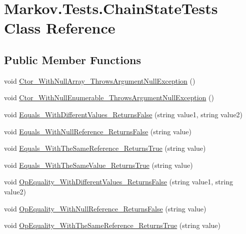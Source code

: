 \hypertarget{class_markov_1_1_tests_1_1_chain_state_tests}{}\section{Markov.\+Tests.\+Chain\+State\+Tests Class Reference}
\label{class_markov_1_1_tests_1_1_chain_state_tests}
\subsection*{Public Member Functions}
\begin{DoxyCompactItemize}
\item 
void \mbox{\hyperlink{class_markov_1_1_tests_1_1_chain_state_tests_a1732c1d9f5264c4b3a4f7db62c382887}{Ctor\+\_\+\+With\+Null\+Array\+\_\+\+Throws\+Argument\+Null\+Exception}} ()
\item 
void \mbox{\hyperlink{class_markov_1_1_tests_1_1_chain_state_tests_a8df3344f8b729836e3906feee2ed6e0c}{Ctor\+\_\+\+With\+Null\+Enumerable\+\_\+\+Throws\+Argument\+Null\+Exception}} ()
\item 
void \mbox{\hyperlink{class_markov_1_1_tests_1_1_chain_state_tests_a6266a5a184b0027b239970f1bd4d3cd9}{Equals\+\_\+\+With\+Different\+Values\+\_\+\+Returns\+False}} (string value1, string value2)
\item 
void \mbox{\hyperlink{class_markov_1_1_tests_1_1_chain_state_tests_a2af281c58c6143a94872ab96e3c89628}{Equals\+\_\+\+With\+Null\+Reference\+\_\+\+Returns\+False}} (string value)
\item 
void \mbox{\hyperlink{class_markov_1_1_tests_1_1_chain_state_tests_a49715a98e44f2af604c8c89a17485604}{Equals\+\_\+\+With\+The\+Same\+Reference\+\_\+\+Returns\+True}} (string value)
\item 
void \mbox{\hyperlink{class_markov_1_1_tests_1_1_chain_state_tests_a7888494e8a911654f08738fa342c5bab}{Equals\+\_\+\+With\+The\+Same\+Value\+\_\+\+Returns\+True}} (string value)
\item 
void \mbox{\hyperlink{class_markov_1_1_tests_1_1_chain_state_tests_a2f32a420320db3b20a1b3f844c80703f}{Op\+Equality\+\_\+\+With\+Different\+Values\+\_\+\+Returns\+False}} (string value1, string value2)
\item 
void \mbox{\hyperlink{class_markov_1_1_tests_1_1_chain_state_tests_ab49265be64b847b6ff8fdca707df4726}{Op\+Equality\+\_\+\+With\+Null\+Reference\+\_\+\+Returns\+False}} (string value)
\item 
void \mbox{\hyperlink{class_markov_1_1_tests_1_1_chain_state_tests_afb7e6cbcf0b528e8323a62c39ef9702a}{Op\+Equality\+\_\+\+With\+The\+Same\+Reference\+\_\+\+Returns\+True}} (string value)

\end{DoxyCompactItemize}
